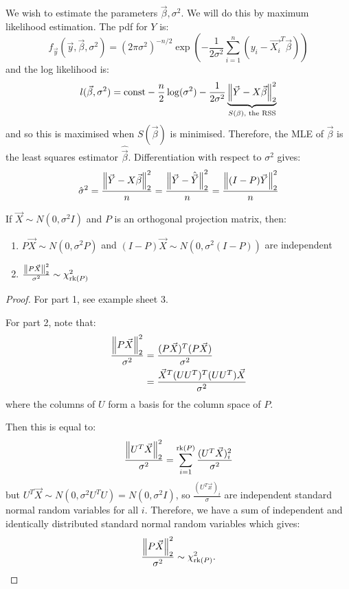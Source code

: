 \documentclass[../Main.tex]{subfiles}
\begin{document}
We wish to estimate the parameters $\vec{\beta}, \sigma^2$. We will do this by maximum likelihood estimation. The pdf for $Y$ is:
\begin{equation*}
    f_{\vec{y}}(\vec{y}, \vec{\beta}, \sigma^2) = (2\pi\sigma^2)^{-n/2} \exp\left(-\frac{1}{2\sigma^2}\sum_{i=1}^{n}(y_i - \vec{X_i}^T \vec{\beta})\right)
\end{equation*}
and the log likelihood is:
\begin{equation*}
    l(\vec{\beta}, \sigma^2) = \text{const}-\frac{n}{2}\log(\sigma^2) - \frac{1}{2\sigma^2} \underbrace{\left\|\vec{Y} - X\vec{\beta}\right\|_2^2}_{S(\beta)\text{, the RSS}}
\end{equation*}
and so this is maximised when $S(\vec{\beta})$ is minimised. Therefore, the MLE of $\vec{\beta}$ is the least squares estimator $\hat{\vec{\beta}}$. Differentiation with respect to $\sigma^2$ gives:
\begin{equation*}
    \hat{\sigma}^2 = \frac{\left\|\vec{Y} - X\vec{\beta}\right\|_2^2}{n} = \frac{\left\|\vec{Y} - \hat{\vec{Y}}\right\|_2^2}{n} = \frac{\left\|(I-P)\vec{Y}\right\|_2^2}{n}
\end{equation*}
\begin{theorem}
    If $\vec{X} \sim N(0, \sigma^2 I)$ and $P$ is an orthogonal projection matrix, then:
    \begin{enumerate}
        \item $P\vec{X} \sim N(0, \sigma^2 P)$ and $(I-P)\vec{X} \sim N(0, \sigma^2(I - P))$ are independent
        \item $\frac{\left\|P\vec{X}\right\|_2^2}{\sigma^2} \sim \chi_{\operatorname{rk}(P)}^2$
    \end{enumerate}
    \label{thmProjectionDists}
\end{theorem}
\begin{proof}
    For part 1, see example sheet 3.

    For part 2, note that:
    \begin{align*}
        \frac{\left\|P\vec{X}\right\|_2^2}{\sigma^2} &= \frac{(P\vec{X})^T(P\vec{X})}{\sigma^2} \\
        &= \frac{\vec{X}^T (UU^T)^T(UU^T)\vec{X}}{\sigma^2}        
    \end{align*}
    where the columns of $U$ form a basis for the column space of $P$.

    Then this is equal to:
    \begin{equation*}
        \frac{\left\|U^T \vec{X}\right\|_2^2}{\sigma^2} = \sum_{i=1}^{\operatorname{rk}(P)} \frac{(U^T\vec{X})_i^2}{\sigma^2}
    \end{equation*}
    but $U^T\vec{X} \sim N(0, \sigma^2 U^T U) = N(0, \sigma^2 I)$, so $\frac{(U^T\vec{x})_i}{\sigma}$ are independent standard normal random variables for all $i$. Therefore, we have a sum of independent and identically distributed standard normal random variables which gives:
    \begin{equation*}
        \frac{\left\|P\vec{X}\right\|_2^2}{\sigma^2} \sim \chi_{\operatorname{rk}(P)}^2.
    \end{equation*}
\end{proof}
\end{document}
